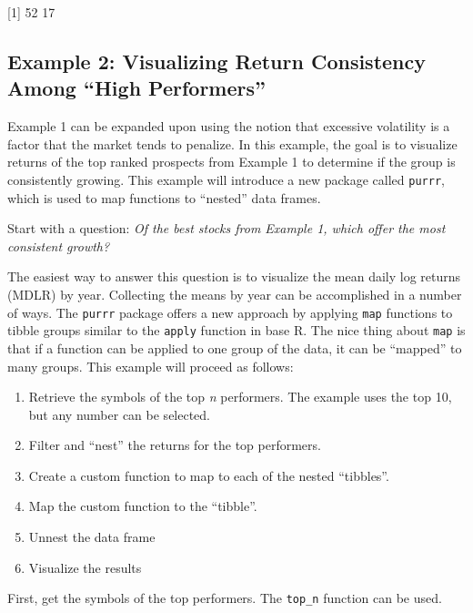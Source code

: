 {[}1{]} 52 17

\hspace{20 mm}

\subsection{\texorpdfstring{Example 2: Visualizing Return Consistency
Among ``High
Performers''}{Example 2: Visualizing Return Consistency Among High Performers}}\label{example-2-visualizing-return-consistency-among-high-performers}

Example 1 can be expanded upon using the notion that excessive
volatility is a factor that the market tends to penalize. In this
example, the goal is to visualize returns of the top ranked prospects
from Example 1 to determine if the group is consistently growing. This
example will introduce a new package called \texttt{purrr}, which is
used to map functions to ``nested'' data frames.

Start with a question: \emph{Of the best stocks from Example 1, which
offer the most consistent growth?}

The easiest way to answer this question is to visualize the mean daily
log returns (MDLR) by year. Collecting the means by year can be
accomplished in a number of ways. The \texttt{purrr} package offers a
new approach by applying \texttt{map} functions to tibble groups similar
to the \texttt{apply} function in base R. The nice thing about
\texttt{map} is that if a function can be applied to one group of the
data, it can be ``mapped'' to many groups. This example will proceed as
follows:

\begin{enumerate}
\def\labelenumi{\arabic{enumi}.}
\tightlist
\item
  Retrieve the symbols of the top \emph{n} performers. The example uses
  the top 10, but any number can be selected.
\item
  Filter and ``nest'' the returns for the top performers.
\item
  Create a custom function to map to each of the nested ``tibbles''.
\item
  Map the custom function to the ``tibble''.
\item
  Unnest the data frame
\item
  Visualize the results
\end{enumerate}

First, get the symbols of the top performers. The \texttt{top\_n}
function can be used.

